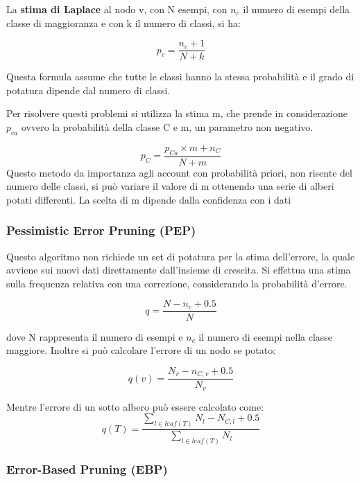 \documentclass[a4paper]{extarticle}
\begin{document}
La \textbf{stima di Laplace} al nodo v, con N esempi, con $n_c$ il numero di esempi della classe di maggioranza e con k il numero di classi, si ha:

\begin{equation*}
p_c = \dfrac{n_c+1}{N+k}
\end{equation*}

Questa formula assume che tutte le classi hanno la stessa probabilità e il grado di potatura dipende dal numero di classi.

Per risolvere questi problemi si utilizza la stima m, che prende in considerazione $p_{ca}$ ovvero la probabilità della classe C e m, un parametro non negativo.

\begin{equation*}
p_C = \dfrac{p_{Ca}\times m + n_C}{N+m}
\end{equation*}
Questo metodo da importanza agli account con probabilità priori, non risente del numero delle classi, si può variare il valore di m ottenendo una serie di alberi potati differenti. La scelta di m dipende dalla confidenza con i dati

\subsubsection{Pessimistic Error Pruning (PEP)}

Questo algoritmo non richiede un set di potatura per la stima dell'errore, la quale avviene sui nuovi dati direttamente dall'insieme di crescita. Si effettua una stima sulla frequenza relativa con una correzione, considerando la probabilità d'errore.

\begin{equation*}
 q = \dfrac{N-n_c+0.5}{N}
\end{equation*}

dove N rappresenta il numero di esempi e $n_c$ il numero di esempi nella classe maggiore. Inoltre si può calcolare l'errore di un nodo se potato:

\begin{equation*}
q(v) = \dfrac{N_v - n_{C,v} +0.5}{N_v}
\end{equation*}

Mentre l'errore di un sotto albero può essere calcolato come:
\begin{equation*}
q(T) = \dfrac{\sum\limits_{l \in leaf(T)} N_l - N_{C,l} + 0.5}{\sum\limits_{l \in leaf(T)} N_l} 
\end{equation*}

\subsubsection{Error-Based Pruning (EBP)}
\end{document}
